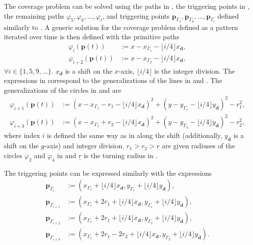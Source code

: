 The coverage problem can be solved using the paths in , the triggering points in , the remaining paths $\varphi_5,\varphi_6,\dots,\varphi_l$, and triggering points $\mathbf{p}_{\Gamma_5},\mathbf{p}_{\Gamma_6},\dots,\mathbf{p}_{\Gamma_l}$ defined similarly to . A generic solution for the coverage problem defined as a pattern iterated over time is then defined with the primitive paths
\begin{subequations}\label{eq:line-gene}\begin{align}
  \varphi_i(\mathbf{p}(t))&:=x-x_{\Gamma_1}-\lfloor i/4\rfloor x_\mathbf{d},\\
  \varphi_{i+2}(\mathbf{p}(t))&:=x-x_{\Gamma_2}-\lfloor i/4\rfloor x_\mathbf{d},
\end{align}
\end{subequations}
$\forall i\in\{1,5,9,\dots\}$. $x_\mathbf{d}$ is a shift on the $x$-axis, $\lfloor i/4\rfloor$ is the integer division. The expressions in  correspond to the generalizations of the lines in  and . The generalizations of the circles in  and  are
\begin{subequations}\label{eq:circ-gene}\begin{align}
  \varphi_{i+1}(\mathbf{p}(t))&:=(x-x_{\Gamma_1}-r_1-\lfloor i/4\rfloor x_\mathbf{d})^2+(y-y_{\Gamma_1}-\lfloor i/4\rfloor y_\mathbf{d})^2-r_1^2,\\
  \varphi_{i+3}(\mathbf{p}(t))&:=(x-x_{\Gamma_2}+r_2-\lfloor i/4\rfloor x_\mathbf{d})^2+(y-y_{\Gamma_3}-\lfloor i/4\rfloor y_\mathbf{d})^2-r_2^2,\label{eq:second-circ-gene}
\end{align}
\end{subequations}
where index $i$ is defined the same way as in  along the shift (additionally, $y_\mathbf{d}$ is a shift on the $y$-axis) and integer division. $r_1>r_2>\underline{r}$ are given radiuses of the circles $\varphi_2$ and $\varphi_4$ in  and $\underline{r}$ is the turning radius in .

The triggering points can be expressed similarly with the expressions
\begin{subequations}\label{eq:trigs-gene}\begin{align}
  \mathbf{p}_{\Gamma_i}&:=(x_{\Gamma_1}+\lfloor i/4\rfloor x_\mathbf{d},y_{\Gamma_1}+\lfloor i/4\rfloor y_\mathbf{d}),\\
  \mathbf{p}_{\Gamma_{i+1}}&:=(x_{\Gamma_1}+2r_1+\lfloor i/4\rfloor x_\mathbf{d},y_{\Gamma_1}+\lfloor i/4\rfloor y_\mathbf{d}),\\
  \mathbf{p}_{\Gamma_{i+2}}&:=(x_{\Gamma_1}+2r_1+\lfloor i/4\rfloor x_\mathbf{d},y_{\Gamma_3}+\lfloor i/4\rfloor y_\mathbf{d}),\\
  \mathbf{p}_{\Gamma_{i+3}}&:=(x_{\Gamma_1}+2r_1-2r_2+\lfloor i/4\rfloor x_\mathbf{d},y_{\Gamma_3}+\lfloor i/4\rfloor y_\mathbf{d})\label{eq:last-trig-gene}.
\end{align}
\end{subequations}

